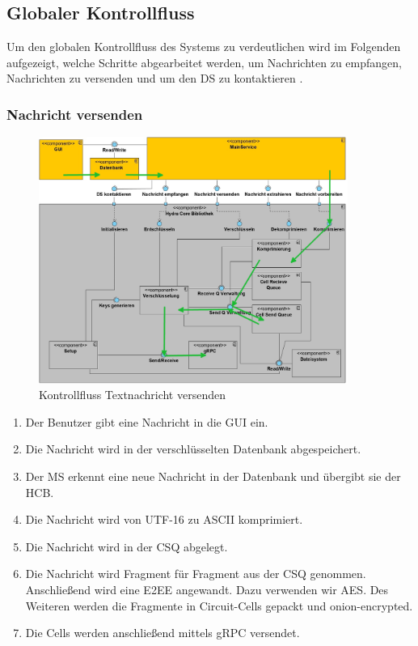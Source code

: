 \subsection{Globaler Kontrollfluss}
Um den globalen Kontrollfluss des Systems zu verdeutlichen wird im Folgenden aufgezeigt, welche Schritte abgearbeitet werden, um Nachrichten zu empfangen, Nachrichten zu versenden und um den \ac{DS} zu kontaktieren . \\
 


\subsubsection{Nachricht versenden}

\begin{figure}[h]
  \centering
     \includegraphics[width=0.9\textwidth]{diagramme/Glob_Kontrollfluss_1.jpg}
  \caption{Kontrollfluss Textnachricht versenden}
  \label{fig:Bild5}
\end{figure}

\begin{enumerate}
    \item
        Der Benutzer gibt eine Nachricht in die \ac{GUI} ein.

    \item
        Die Nachricht wird in der verschlüsselten Datenbank abgespeichert.

    \item
        Der \ac{MS} erkennt eine neue Nachricht in der Datenbank und übergibt sie der \ac{HCB}.

    \item
        Die Nachricht wird von UTF-16 zu ASCII komprimiert.

    \item
        Die Nachricht wird in der \ac{CSQ} abgelegt.

    \item
        Die Nachricht wird Fragment für Fragment aus der \ac{CSQ}  genommen. Anschließend wird eine \ac{E2EE} angewandt. Dazu verwenden wir \ac{AES}. Des Weiteren werden die Fragmente in Circuit-Cells gepackt und onion-encrypted.

    \item
        Die Cells werden anschließend mittels \ac{gRPC} versendet.
\end{enumerate}

